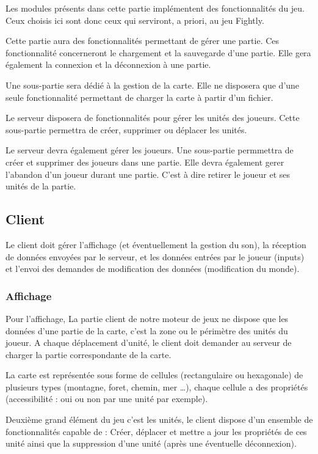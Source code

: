 \documentclass[a4paper,10pt]{report}
\begin{document}
Les modules présents dans cette partie implémentent des fonctionnalités du jeu. Ceux choisis ici sont donc ceux qui serviront, a priori, au jeu Fightly.

Cette partie aura des fonctionnalités permettant de gérer une partie. Ces fonctionnalité concerneront le chargement et la sauvegarde d'une partie. Elle gera également la connexion et la déconnexion à une partie.

Une sous-partie sera dédié à la gestion de la carte. Elle ne disposera que d'une seule fonctionnalité permettant de charger la carte à partir d'un fichier.

Le serveur disposera de fonctionnalités pour gérer les unités des joueurs. Cette sous-partie permettra de créer, supprimer ou déplacer les unités.

Le serveur devra également gérer les joueurs. Une sous-partie permmettra de créer et supprimer des joueurs dans une partie. Elle devra également gerer l'abandon d'un joueur durant une partie. C'est à dire retirer le joueur et ses unités de la partie.

\subsection{Client}

Le client doit gérer l'affichage (et éventuellement la gestion du son), la réception de données envoyées par le serveur, et les données entrées par le joueur (inputs) et l'envoi des demandes de modification des données (modification du monde).

\subsubsection{Affichage}

Pour l’affichage, La partie client de notre moteur de jeux ne dispose que les données d’une partie de la carte, c’est la zone ou le périmètre des unités du joueur. A chaque déplacement d’unité, le client doit demander au serveur de charger la partie  correspondante de la carte.

La carte est représentée sous forme de cellules (rectangulaire ou hexagonale) de plusieurs types (montagne, foret, chemin, mer …), chaque cellule a des propriétés (accessibilité : oui ou non par une unité par exemple).

Deuxième grand élément du jeu c’est les unités, le client dispose d’un ensemble de fonctionnalités capable de : Créer, déplacer et mettre a jour les propriétés de ces unité ainsi que la suppression d’une unité (après une éventuelle déconnexion).
\end{document}
